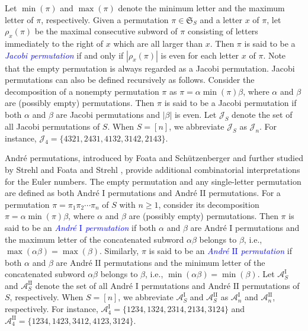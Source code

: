 \documentclass[12pt]{article}
\def\blue{\textcolor{blue}}
\def\blue{\textcolor{blue}}
\numberwithin{equation}{section}
\def\blue{\textcolor{blue}}
\def\blue{\textcolor{blue}}
\theoremstyle{plain}
\def\S{\mathfrak{S}}
\begin{document}
  Let $\min(\pi)$ and $\max(\pi)$ denote the minimum letter and the maximum letter of $\pi$, respectively.    
 Given a permutation  $\pi\in\S_S$ and  a letter $x$ of $\pi$, let $\rho_x(\pi)$ be the maximal consecutive
 subword of $\pi$ consisting of letters immediately to the right of $x$ which are all larger than $x$.  Then $\pi$ is said to be a \blue{\em Jacobi permutation} if and only if $|\rho_x(\pi)|$ is even for each  letter $x$ of $\pi$. Note that the empty permutation is always regarded as a  Jacobi permutation. 
  Jacobi permutations can also be defined recursively as follows.
  	Consider the decomposition of a nonempty permutation $\pi$ as   $\pi=\alpha \min(\pi)\beta$, where $\alpha$ and $\beta$ are (possibly empty) permutations.   Then $\pi$ 
  	is said to be a  Jacobi permutation if  both $\alpha$ and $\beta$ are Jacobi permutations and $|\beta|$ is even. 
   Let $\mathcal{J}_S$ denote the set of all Jacobi permutations of $S$. When $S=[n]$,  we abbreviate $\mathcal{J}_S$ as  $\mathcal{J}_n$. 
   For instance,  $\mathcal{J}_4=\{ 
   4321,  2431, 4132, 3142,  2143\}$. 
   
   
   
   
   Andr\'e permutations, introduced by Foata and Sch\"utzenberger \cite{FS70} and further studied by Strehl \cite{Str74} and Foata and Strehl \cite{FS74, FS76}, provide additional combinatorial interpretations for the Euler numbers.  The empty
   permutation  and any single-letter permutation are defined as both Andr\'e   $\mathrm{I} $ permutations 
   and Andr\'e  $\mathrm{II} $ permutations.
   For a permutation $\pi= \pi_1\pi_2\cdots\pi_n$ of  $S$ with $n\ge 1$, consider its decomposition $\pi= \alpha \min(\pi)\beta$, where  $\alpha$ and $\beta$ are (possibly empty) permutations. Then $\pi$ is said to be an \blue{\em Andr\'e  $\mathrm{I} $ permutation}   if both $\alpha$ and $\beta$ are Andr\'{e} $\mathrm{I} $ permutations  and  the maximum letter  of the concatenated subword $\alpha\beta$ belongs to $\beta$, i.e., $\max(\alpha\beta)=\max(\beta)$.  Similarly, $\pi$ is said to be an \blue{\em Andr\'e  $\mathrm{II} $ permutation}   if   both $\alpha$ and $\beta$ are Andr\'{e} $\mathrm{II} $ permutations  and  the minimum  letter  of the concatenated subword $\alpha\beta$ belongs to $\beta$, i.e., $\min(\alpha\beta)=\min(\beta)$.
   Let $\mathcal{A}^{\mathrm{I}}_S$  and $\mathcal{A}^{\mathrm{II}}_S$ denote the set of all Andr\'{e} $\mathrm{I} $ permutations and Andr\'{e} $\mathrm{II} $ permutations of $S$, respectively. When $S=[n]$,  we abbreviate $\mathcal{A}^{\mathrm{I}}_S$ and $\mathcal{A}^{\mathrm{II}}_S$ as  $\mathcal{A}^{\mathrm{I}}_n$ and $\mathcal{A}^{\mathrm{II}}_n$, respectively. 
   For instance,  $\mathcal{A}^{\mathrm{I}}_4=\{1234, 1324, 2314, 2134, 3124
    \}$ and  $\mathcal{A}^{\mathrm{II}}_4=\{ 1234, 1423, 3412, 4123, 3124  
    \}$. 
    
\end{document}
